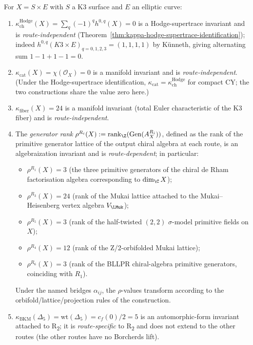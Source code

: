 \begin{theorem}
\label{thm:kappa-stratification-CY-C}
For $X = S \times E$ with $S$ a K3 surface and $E$ an elliptic curve:
\begin{enumerate}[label=\textup{(\roman*)}]
 \item $\kappa_{\mathrm{ch}}^{\mathrm{Hodge}}(X) = \sum_{q} (-1)^{q} h^{0,q}(X) = 0$ is a Hodge-supertrace invariant and is \emph{route-independent} (Theorem~\ref{thm:kappa-hodge-supertrace-identification}); indeed $h^{0,q}(K3 \times E)_{q=0,1,2,3} = (1, 1, 1, 1)$ by K\"unneth, giving alternating sum $1 - 1 + 1 - 1 = 0$.
 \item $\kappa_{\mathrm{cat}}(X) = \chi(\mathcal{O}_X) = 0$ is a manifold invariant and is \emph{route-independent}. (Under the Hodge-supertrace identification, $\kappa_{\mathrm{cat}} = \kappa_{\mathrm{ch}}^{\mathrm{Hodge}}$ for compact CY; the two constructions share the value zero here.)
 \item $\kappa_{\mathrm{fiber}}(X) = 24$ is a manifold invariant (total Euler characteristic of the K3 fiber) and is \emph{route-independent}.
 \item The \emph{generator rank} $\rho^{R_i}(X) := \mathrm{rank}_\Z(\mathrm{Gen}(A_X^{R_i}))$, defined as the rank of the primitive generator lattice of the output chiral algebra at each route, is an algebraization invariant and is \emph{route-dependent}; in particular:
 \begin{itemize}
 \item $\rho^{R_1}(X) = 3$ (the three primitive generators of the chiral de Rham factorisation algebra corresponding to $\dim_\C X$);
 \item $\rho^{R_3}(X) = 24$ (rank of the Mukai lattice attached to the Mukai--Heisenberg vertex algebra $V_{\LMuk}$);
 \item $\rho^{R_5}(X) = 3$ (rank of the half-twisted $(2,2)$ $\sigma$-model primitive fields on $X$);
 \item $\rho^{R_4}(X) = 12$ (rank of the Z/2-orbifolded Mukai lattice);
 \item $\rho^{R_6}(X) = 3$ (rank of the BLLPR chiral-algebra primitive generators, coinciding with $R_1$).
 \end{itemize}
 Under the named bridges $\alpha_{ij}$, the $\rho$-values transform according to the orbifold/lattice/projection rules of the construction.
 \item $\kappa_{\mathrm{BKM}}(\Delta_5) = \mathrm{wt}(\Delta_5) = c_f(0)/2 = 5$ is an automorphic-form invariant attached to R\textsubscript{2}; it is \emph{route-specific} to R\textsubscript{2} and does not extend to the other routes (the other routes have no Borcherds lift).

\end{enumerate}
\end{theorem}
